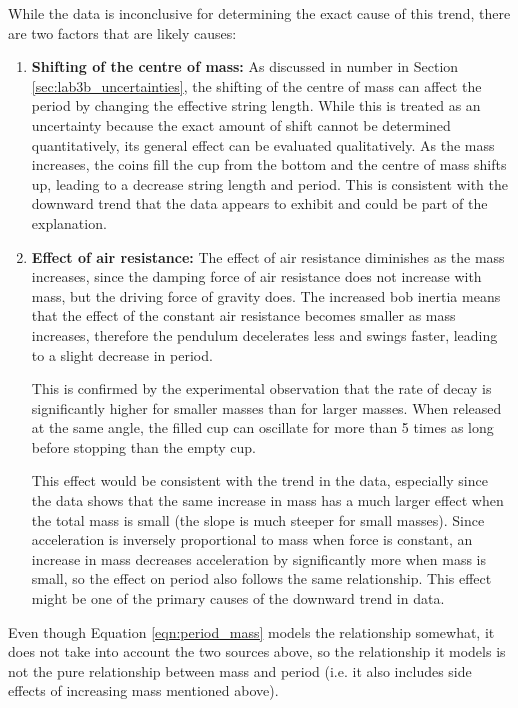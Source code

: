 \documentclass[aps,twocolumn,secnumarabic,nobalancelastpage,amsmath,amssymb,nofootinbib,floatfix,letterpaper]{revtex4}
\begin{document}
While the data is inconclusive for determining the exact cause of this trend, there are two factors that are likely
causes:
\begin{enumerate}
    \item
        \textbf{Shifting of the centre of mass:} As discussed in number  in Section
        \ref{sec:lab3b_uncertainties}, the shifting of the centre of mass can affect the period by changing the
        effective string length. While this is treated as an uncertainty because the exact amount of shift cannot be
        determined quantitatively, its general effect can be evaluated qualitatively. As the mass increases, the coins
        fill the cup from the bottom and the centre of mass shifts up, leading to a decrease string length and period.
        This is consistent with the downward trend that the data appears to exhibit and could be part of the explanation.
    \item
        \textbf{Effect of air resistance:} The effect of air resistance diminishes as the mass increases, since the
        damping force of air resistance does not increase with mass, but the driving force of gravity does. The
        increased bob inertia means that the effect of the constant air resistance becomes smaller as mass increases,
        therefore the pendulum decelerates less and swings faster, leading to a slight decrease in period.

        This is confirmed by the experimental observation that the rate of decay is significantly higher for smaller
        masses than for larger masses. When released at the same angle, the filled cup can oscillate for more than 5
        times as long before stopping than the empty cup.

        This effect would be consistent with the trend in the data, especially since the data shows that the same
        increase in mass has a much larger effect when the total mass is small (the slope is much steeper for small
        masses). Since acceleration is inversely proportional to mass when force is constant, an increase in mass
        decreases acceleration by significantly more when mass is small, so the effect on period also follows the same
        relationship. This effect might be one of the primary causes of the downward trend in data.
\end{enumerate}

Even though Equation \ref{eqn:period_mass} models the relationship somewhat, it does not take into account the two sources above,
so the relationship it models is not the pure relationship between mass and period (i.e. it also includes side effects
of increasing mass mentioned above).
\end{document}
